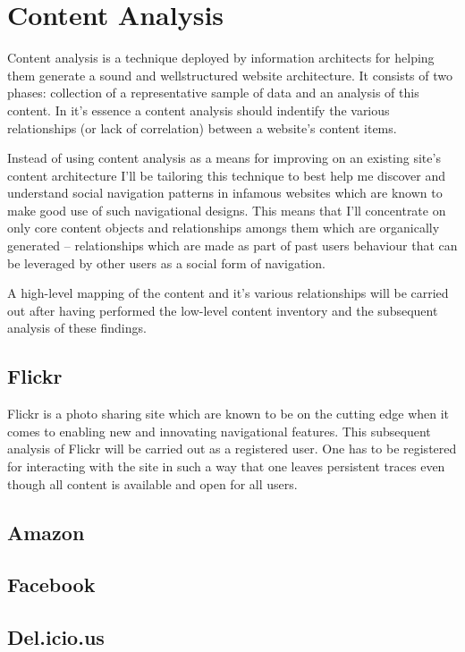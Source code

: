 \chapter{Content Analysis}

Content analysis is a technique deployed by information architects for helping
them generate a sound and wellstructured website architecture. It consists of
two phases: collection of a representative sample of data and an analysis of
this content. In it's essence a content analysis should indentify the various
relationships (or lack of correlation) between a website's content items.

Instead of using content analysis as a means for improving on an existing
site's content architecture I'll be tailoring this technique to best help me
discover and understand social navigation patterns in infamous websites which
are known to make good use of such navigational designs. This means that I'll
concentrate on only core content objects and relationships amongs them
which are organically generated -- relationships which are made as part of
past users behaviour that can be leveraged by other users as a social form
of navigation.

A high-level mapping of the content and it's various relationships
will be carried out after having performed the low-level content inventory
and the subsequent analysis of these findings.

\section{Flickr}

Flickr is a photo sharing site which are known to be on the cutting edge when
it comes to enabling new and innovating navigational features. This subsequent
analysis of Flickr will be carried out as a registered user. One has to be
registered for interacting with the site in such a way that one leaves
persistent traces even though all content is available and open for all users.

\section{Amazon}

\section{Facebook}

\section{Del.icio.us}
